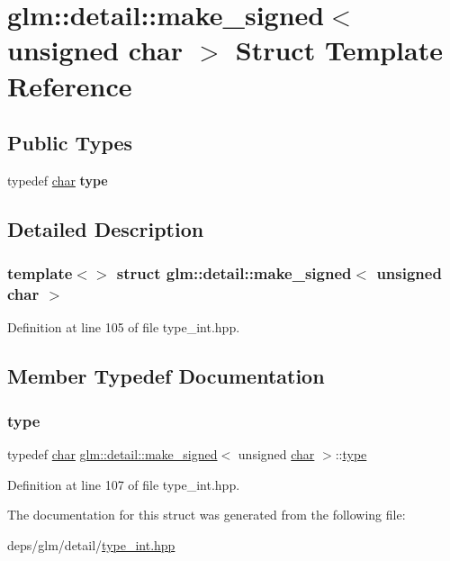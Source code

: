 \hypertarget{structglm_1_1detail_1_1make__signed_3_01unsigned_01char_01_4}{}\section{glm\+:\+:detail\+:\+:make\+\_\+signed$<$ unsigned char $>$ Struct Template Reference}
\label{structglm_1_1detail_1_1make__signed_3_01unsigned_01char_01_4}
\subsection*{Public Types}
\begin{DoxyCompactItemize}
\item 
\mbox{\label{structglm_1_1detail_1_1make__signed_3_01unsigned_01char_01_4_a38e3001baf7964626c6e7dff83b4ba95}} 
typedef \hyperlink{classchar}{char} {\bfseries type}
\end{DoxyCompactItemize}


\subsection{Detailed Description}
\subsubsection*{template$<$$>$\newline
struct glm\+::detail\+::make\+\_\+signed$<$ unsigned char $>$}



Definition at line 105 of file type\+\_\+int.\+hpp.



\subsection{Member Typedef Documentation}
\mbox{\label{structglm_1_1detail_1_1make__signed_3_01unsigned_01char_01_4_a38e3001baf7964626c6e7dff83b4ba95}} 
\subsubsection{\texorpdfstring{type}{type}}
{\footnotesize\ttfamily typedef \hyperlink{classchar}{char} \hyperlink{structglm_1_1detail_1_1make__signed}{glm\+::detail\+::make\+\_\+signed}$<$ unsigned \hyperlink{classchar}{char} $>$\+::\hyperlink{classchar}{type}}



Definition at line 107 of file type\+\_\+int.\+hpp.



The documentation for this struct was generated from the following file\+:\begin{DoxyCompactItemize}
\item 
deps/glm/detail/\hyperlink{type__int_8hpp}{type\+\_\+int.\+hpp}\end{DoxyCompactItemize}
